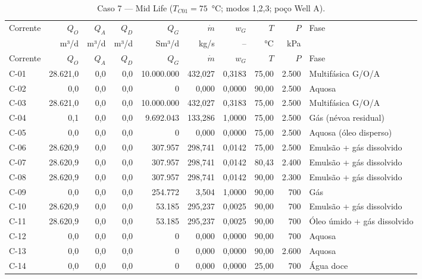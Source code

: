 \documentclass[11pt,a4paper]{article}
\numberwithin{equation}{section}
\numberwithin{table}{section}
\numberwithin{figure}{section}
\begin{document}
{\footnotesize\setlength{\tabcolsep}{3pt}\begin{longtable}{lrrrrrrrrL{2.5cm}}
\caption{Caso 7 --- Mid Life ($T_{C01}=75$~°C; modos 1,2,3; poço Well A).}\\\toprule
Corrente & $Q_O$ & $Q_A$ & $Q_D$ & $Q_G$ & $\dot m$ & $w_G$ & $T$ & $P$ & Fase\\ & m³/d & m³/d & m³/d & Sm³/d & kg/s & -- & °C & kPa & \\\midrule\endfirsthead
\toprule Corrente & $Q_O$ & $Q_A$ & $Q_D$ & $Q_G$ & $\dot m$ & $w_G$ & $T$ & $P$ & Fase\\\midrule\endhead
C-01 & 28.621,0 & 0,0 & 0,0 & 10.000.000 & 432,027 & 0,3183 & 75,00 & 2.500 & {\scriptsize Multifásica G/O/A}\\
C-02 & 0,0 & 0,0 & 0,0 & 0 & 0,000 & 0,0000 & 90,00 & 2.500 & {\scriptsize Aquosa}\\
C-03 & 28.621,0 & 0,0 & 0,0 & 10.000.000 & 432,027 & 0,3183 & 75,00 & 2.500 & {\scriptsize Multifásica G/O/A}\\
C-04 & 0,1 & 0,0 & 0,0 & 9.692.043 & 133,286 & 1,0000 & 75,00 & 2.500 & {\scriptsize Gás (névoa residual)}\\
C-05 & 0,0 & 0,0 & 0,0 & 0 & 0,000 & 0,0000 & 75,00 & 2.500 & {\scriptsize Aquosa (óleo disperso)}\\
C-06 & 28.620,9 & 0,0 & 0,0 & 307.957 & 298,741 & 0,0142 & 75,00 & 2.500 & {\scriptsize Emulsão + gás dissolvido}\\
C-07 & 28.620,9 & 0,0 & 0,0 & 307.957 & 298,741 & 0,0142 & 80,43 & 2.400 & {\scriptsize Emulsão + gás dissolvido}\\
C-08 & 28.620,9 & 0,0 & 0,0 & 307.957 & 298,741 & 0,0142 & 90,00 & 2.300 & {\scriptsize Emulsão + gás dissolvido}\\
C-09 & 0,0 & 0,0 & 0,0 & 254.772 & 3,504 & 1,0000 & 90,00 & 700 & {\scriptsize Gás}\\
C-10 & 28.620,9 & 0,0 & 0,0 & 53.185 & 295,237 & 0,0025 & 90,00 & 700 & {\scriptsize Emulsão + gás dissolvido}\\
C-11 & 28.620,9 & 0,0 & 0,0 & 53.185 & 295,237 & 0,0025 & 90,00 & 700 & {\scriptsize Óleo úmido + gás dissolvido}\\
C-12 & 0,0 & 0,0 & 0,0 & 0 & 0,000 & 0,0000 & 90,00 & 700 & {\scriptsize Aquosa}\\
C-13 & 0,0 & 0,0 & 0,0 & 0 & 0,000 & 0,0000 & 90,00 & 2.600 & {\scriptsize Aquosa}\\
C-14 & 0,0 & 0,0 & 0,0 & 0 & 0,000 & 0,0000 & 25,00 & 700 & {\scriptsize Água doce}\\

\end{longtable}}
\end{document}
